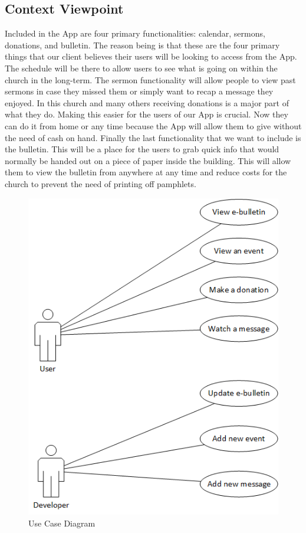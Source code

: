 \documentclass[letterpaper,10pt,draftclsnofoot,onecolumn,titlepage]{IEEEtran}
\begin{document}
		\subsection{Context Viewpoint}
		Included in the \gls{App} are four primary functionalities: calendar, sermons, donations, and bulletin.
		The reason being is that these are the four primary things that our client believes their users will be looking to access from the \gls{App}.
		The schedule will be there to allow users to see what is going on within the church in the long-term.
		The sermon functionality will allow people to view past sermons in case they missed them or simply want to recap a message they enjoyed.
		In this church and many others receiving donations is a major part of what they do.
		Making this easier for the users of our \gls{App} is crucial.
		Now they can do it from home or any time because the \gls{App} will allow them to give without the need of cash on hand.
		Finally the last functionality that we want to include is the bulletin.
		This will be a place for the users to grab quick info that would normally be handed out on a piece of paper inside the building.
		This will allow them to view the bulletin from anywhere at any time and reduce costs for the church to prevent the need of printing off pamphlets.

		\begin{figure}[H]
			\centering
			\includegraphics[natwidth=462, natheight=585]{UseCase.png}
			\caption{Use Case Diagram}
			\label{fig:usecase}
		\end{figure}
\end{document}
